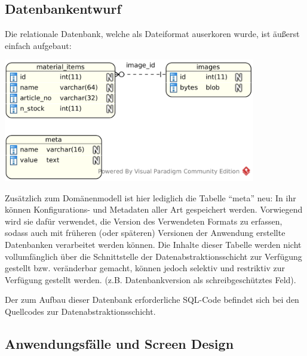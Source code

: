 \subsection{Datenbankentwurf}
Die relationale Datenbank, welche als Dateiformat auserkoren wurde, ist äußerst
einfach aufgebaut:

\begin{center}
\noindent\includegraphics[width=110mm,keepaspectratio]{images/03-datenbankmodell.png}
\end{center}

Zusätzlich zum Domänenmodell ist hier lediglich die Tabelle ``meta'' neu: In ihr können
Konfigurations- und Metadaten aller Art gespeichert werden. Vorwiegend wird sie dafür
verwendet, die Version des Verwendeten Formats zu erfassen, sodass auch mit früheren
(oder späteren) Versionen der Anwendung erstellte Datenbanken verarbeitet werden können.
Die Inhalte dieser Tabelle werden nicht vollumfänglich über die Schnittstelle der
Datenabstraktionsschicht zur Verfügung gestellt bzw. veränderbar gemacht, können jedoch selektiv
und restriktiv zur Verfügung gestellt werden. (z.B. Datenbankversion als schreibgeschütztes Feld).

Der zum Aufbau dieser Datenbank erforderliche SQL-Code befindet sich bei den Quellcodes
zur Datenabstraktionsschicht.

\subsection{Anwendungsfälle und Screen Design}